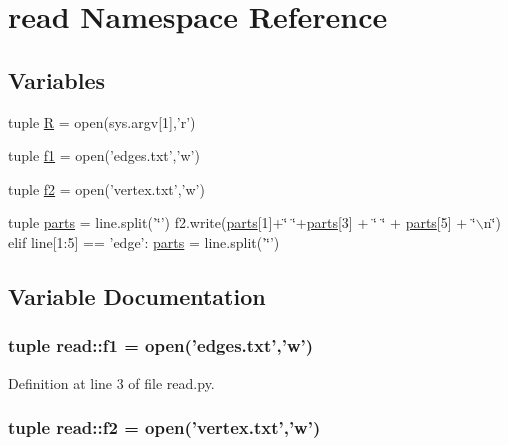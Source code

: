 \hypertarget{namespaceread}{\section{read \-Namespace \-Reference}
\label{namespaceread}
}
\subsection*{\-Variables}
\begin{DoxyCompactItemize}
\item 
tuple \hyperlink{namespaceread_a34c7733413dd5c3164605c8b41f31f6d}{\-R} = open(sys.\-argv\mbox{[}1\mbox{]},'r')
\item 
tuple \hyperlink{namespaceread_ab74d758e4eb7694c7dd86deac82ea286}{f1} = open('edges.\-txt','w')
\item 
tuple \hyperlink{namespaceread_a36e4b232e1c6a0b845e8e8a941e437d2}{f2} = open('vertex.\-txt','w')
\item 
tuple \hyperlink{namespaceread_a39497ffc1642e3fa13cd1f57a935ac5c}{parts} = line.\-split('\char`\"{}') f2.\-write(\hyperlink{namespaceread_a39497ffc1642e3fa13cd1f57a935ac5c}{parts}\mbox{[}1\mbox{]}+\char`\"{} \char`\"{}+\hyperlink{namespaceread_a39497ffc1642e3fa13cd1f57a935ac5c}{parts}\mbox{[}3\mbox{]} + \char`\"{} \char`\"{} + \hyperlink{namespaceread_a39497ffc1642e3fa13cd1f57a935ac5c}{parts}\mbox{[}5\mbox{]} + \char`\"{}$\backslash$n\char`\"{}) elif line\mbox{[}1\-:5\mbox{]} == 'edge'\-: \hyperlink{namespaceread_a39497ffc1642e3fa13cd1f57a935ac5c}{parts} = line.\-split('\char`\"{}')
\end{DoxyCompactItemize}


\subsection{\-Variable \-Documentation}
\hypertarget{namespaceread_ab74d758e4eb7694c7dd86deac82ea286}{
\subsubsection[{f1}]{\setlength{\rightskip}{0pt plus 5cm}tuple {\bf read\-::f1} = open('edges.\-txt','w')}}\label{namespaceread_ab74d758e4eb7694c7dd86deac82ea286}


\-Definition at line 3 of file read.\-py.

\hypertarget{namespaceread_a36e4b232e1c6a0b845e8e8a941e437d2}{
\subsubsection[{f2}]{\setlength{\rightskip}{0pt plus 5cm}tuple {\bf read\-::f2} = open('vertex.\-txt','w')}}\label{namespaceread_a36e4b232e1c6a0b845e8e8a941e437d2}


